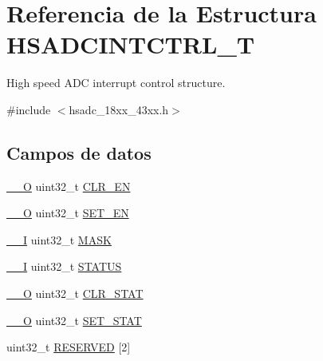 \hypertarget{struct_h_s_a_d_c_i_n_t_c_t_r_l___t}{}\section{Referencia de la Estructura H\+S\+A\+D\+C\+I\+N\+T\+C\+T\+R\+L\+\_\+T}
\label{struct_h_s_a_d_c_i_n_t_c_t_r_l___t}


High speed A\+DC interrupt control structure.  




{\ttfamily \#include $<$hsadc\+\_\+18xx\+\_\+43xx.\+h$>$}

\subsection*{Campos de datos}
\begin{DoxyCompactItemize}
\item 
\hyperlink{core__sc300_8h_a7e25d9380f9ef903923964322e71f2f6}{\+\_\+\+\_\+O} uint32\+\_\+t \hyperlink{struct_h_s_a_d_c_i_n_t_c_t_r_l___t_a0d317a6488644b87e17e5f559c08289f}{C\+L\+R\+\_\+\+EN}
\item 
\hyperlink{core__sc300_8h_a7e25d9380f9ef903923964322e71f2f6}{\+\_\+\+\_\+O} uint32\+\_\+t \hyperlink{struct_h_s_a_d_c_i_n_t_c_t_r_l___t_ad4ee2600dffc97b5487b479978433ed0}{S\+E\+T\+\_\+\+EN}
\item 
\hyperlink{core__sc300_8h_af63697ed9952cc71e1225efe205f6cd3}{\+\_\+\+\_\+I} uint32\+\_\+t \hyperlink{struct_h_s_a_d_c_i_n_t_c_t_r_l___t_ab832a1f3a60a10493eb8b93a9f7a049b}{M\+A\+SK}
\item 
\hyperlink{core__sc300_8h_af63697ed9952cc71e1225efe205f6cd3}{\+\_\+\+\_\+I} uint32\+\_\+t \hyperlink{struct_h_s_a_d_c_i_n_t_c_t_r_l___t_aece2c880dc5ba01a2fc9326dc080dc26}{S\+T\+A\+T\+US}
\item 
\hyperlink{core__sc300_8h_a7e25d9380f9ef903923964322e71f2f6}{\+\_\+\+\_\+O} uint32\+\_\+t \hyperlink{struct_h_s_a_d_c_i_n_t_c_t_r_l___t_a2736f94695ea3082afc55537cc4172b4}{C\+L\+R\+\_\+\+S\+T\+AT}
\item 
\hyperlink{core__sc300_8h_a7e25d9380f9ef903923964322e71f2f6}{\+\_\+\+\_\+O} uint32\+\_\+t \hyperlink{struct_h_s_a_d_c_i_n_t_c_t_r_l___t_aa392d0314798880efcc1243457aad369}{S\+E\+T\+\_\+\+S\+T\+AT}
\item 
uint32\+\_\+t \hyperlink{struct_h_s_a_d_c_i_n_t_c_t_r_l___t_afaf27b66c1edc60064db3fa6e693fb59}{R\+E\+S\+E\+R\+V\+ED} \mbox{[}2\mbox{]}
\end{DoxyCompactItemize}


